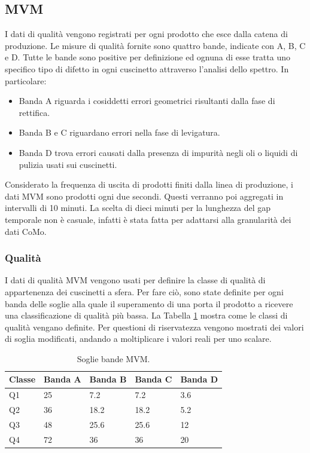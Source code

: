 \subsection{MVM}
I dati di qualità vengono registrati per ogni prodotto che esce dalla catena di produzione.
Le misure di qualità fornite sono quattro bande, indicate con A, B, C e D.
Tutte le bande sono positive per definizione ed ognuna di esse tratta uno specifico tipo di difetto in ogni cuscinetto attraverso l'analisi dello spettro. In particolare:
\begin{itemize}
	\item Banda A riguarda i cosiddetti errori geometrici risultanti dalla fase di rettifica.
	\item Banda B e C riguardano errori nella fase di levigatura.
	\item Banda D trova errori causati dalla presenza di impurità negli oli o liquidi di pulizia usati sui cuscinetti.
\end{itemize}

Considerato la frequenza di uscita di prodotti finiti dalla linea di produzione, i dati MVM sono prodotti ogni due secondi. Questi verranno poi aggregati in intervalli di 10 minuti. La scelta di dieci minuti per la lunghezza del gap temporale non è casuale, infatti è stata fatta per adattarsi alla granularità dei dati CoMo.

\subsubsection{Qualità}
I dati di qualità MVM vengono usati per definire la classe di qualità di appartenenza dei cuscinetti a sfera. Per fare ciò, sono state definite per ogni banda delle soglie alla quale il superamento di una porta il prodotto a ricevere una classificazione di qualità più bassa.
La Tabella \ref{mvm-soglie} mostra come le classi di qualità vengano definite. Per questioni di riservatezza vengono mostrati dei valori di soglia modificati, andando a moltiplicare i valori reali per uno scalare.

\begin{table}
	\caption{\label{mvm-soglie}Soglie bande MVM.}
	\centering
	\begin{tabular}{|l|l|l|l|l|}
		\hline
		Classe & \multicolumn{1}{c|}{Banda A} & \multicolumn{1}{c|}{Banda B} & \multicolumn{1}{c|}{Banda C} & \multicolumn{1}{c|}{Banda D} \\ \hline
		Q1     & 25                           & 7.2                          & 7.2                          & 3.6                          \\ \hline
		Q2     & 36                           & 18.2                         & 18.2                         & 5.2                          \\ \hline
		Q3     & 48                           & 25.6                         & 25.6                         & 12                           \\ \hline
		Q4     & 72                           & 36                           & 36                           & 20                           \\ \hline
	\end{tabular}
\end{table}


